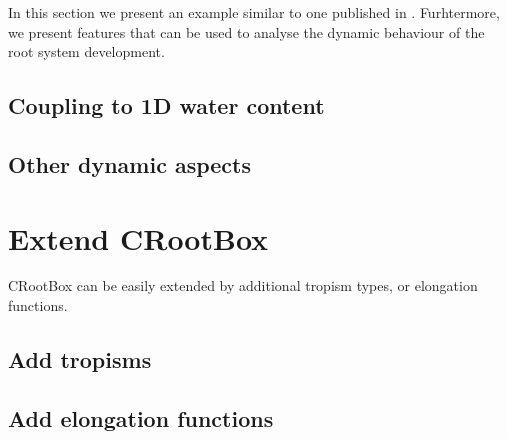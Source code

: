 \documentclass[a4paper]{article}
\begin{document}
In this section we present an example similar to one published in . 
Furhtermore, we present features that can be used to analyse the dynamic behaviour of the root system development.

\subsection{Coupling to 1D water content}

\subsection{Other dynamic aspects}



\section{Extend CRootBox}

CRootBox can be easily extended by additional tropism types, or elongation functions. 

\subsection{Add tropisms}

\subsection{Add elongation functions}








\end{document}
